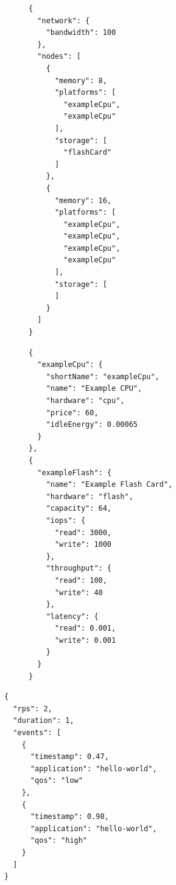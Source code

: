 \begin{figure}[!ht]
    \label{code:herosim-json-infrastructure}
    \begin{minipage}{0.5\textwidth}
        \centering
        \begin{verbatim}
{
  "network": {
    "bandwidth": 100
  },
  "nodes": [
    {
      "memory": 8,
      "platforms": [
        "exampleCpu",
        "exampleCpu"
      ],
      "storage": [
        "flashCard"
      ]
    },
    {
      "memory": 16,
      "platforms": [
        "exampleCpu",
        "exampleCpu",
        "exampleCpu",
        "exampleCpu"
      ],
      "storage": [
      ]
    }
  ]
}
        \end{verbatim}
    \end{minipage}
    \begin{minipage}{0.5\textwidth}
        \centering
        \begin{verbatim}
{
  "exampleCpu": {
    "shortName": "exampleCpu",
    "name": "Example CPU",
    "hardware": "cpu",
    "price": 60,
    "idleEnergy": 0.00065
  }
},
{
  "exampleFlash": {
    "name": "Example Flash Card",
    "hardware": "flash",
    "capacity": 64,
    "iops": {
      "read": 3000,
      "write": 1000
    },
    "throughput": {
      "read": 100,
      "write": 40
    },
    "latency": {
      "read": 0.001,
      "write": 0.001
    }
  }
}
        \end{verbatim}
    \end{minipage}
\end{figure}

\begin{listing}
    \caption{Description \gls{JSON} d'une trace d'exécution comportant deux appels à l'application \texttt{hello-world}.}
    \label{code:herosim-json-trace}
    \begin{verbatim}
{
  "rps": 2,
  "duration": 1,
  "events": [
    {
      "timestamp": 0.47,
      "application": "hello-world",
      "qos": "low"
    },
    {
      "timestamp": 0.98,
      "application": "hello-world",
      "qos": "high"
    }
  ]
}
    \end{verbatim}
\end{listing}

